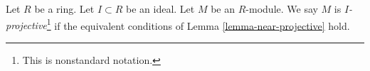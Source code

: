 \begin{definition}
\label{definition-near-projective}
Let $R$ be a ring. Let $I \subset R$ be an ideal. Let $M$ be an $R$-module.
We say $M$ is {\it $I$-projective}\footnote{This is nonstandard notation.}
if the equivalent conditions of Lemma \ref{lemma-near-projective} hold.
\end{definition}